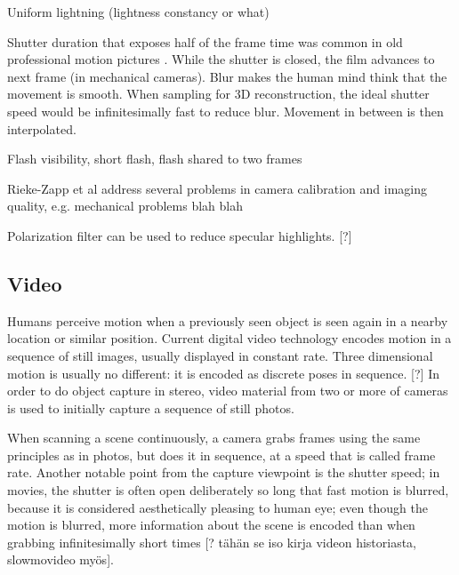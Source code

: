 Uniform lightning (lightness constancy or what)

Shutter duration that exposes half of the frame time was common in old professional motion pictures \cite{wilson2004anton}.
While the shutter is closed, the film advances to next frame (in mechanical cameras).
Blur makes the human mind think that the movement is smooth.
When sampling for 3D reconstruction, the ideal shutter speed would be infinitesimally fast to reduce blur.
Movement in between is then interpolated.

Flash visibility, short flash, flash shared to two frames

Rieke-Zapp et al \cite{rieke2009evaluation} address several problems in camera calibration and imaging quality, e.g. mechanical problems blah blah

Polarization filter can be used to reduce specular highlights. [?] 

\subsection{Video}

Humans perceive motion when a previously seen object is seen again in a nearby location or similar position. Current digital video technology encodes motion in a sequence of still images, usually displayed in constant rate. Three dimensional motion is usually no different: it is encoded as discrete poses in sequence. [?] In order to do object capture in stereo, video material from two or more of cameras is used to initially capture a sequence of still photos.

When scanning a scene continuously, a camera grabs frames using the same principles as in photos, but does it in sequence, at a speed that is called frame rate. Another notable point from the capture viewpoint is the shutter speed; in movies, the shutter is often open deliberately so long that fast motion is blurred, because it is considered aesthetically pleasing to human eye; even though the motion is blurred, more information about the scene is encoded than when grabbing infinitesimally short times [? tähän se iso kirja videon historiasta, slowmovideo myös].

